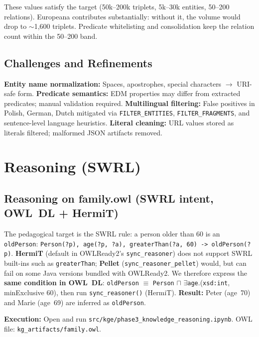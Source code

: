 \documentclass[11pt,a4paper]{article}
\begin{document}
These values satisfy the target (50k--200k triplets, 5k--30k entities, 50--200 relations). Europeana contributes substantially: without it, the volume would drop to $\sim$1,600 triplets. Predicate whitelisting and consolidation keep the relation count within the 50--200 band.

\subsection{Challenges and Refinements}

\textbf{Entity name normalization:} Spaces, apostrophes, special characters $\rightarrow$ URI-safe form. \textbf{Predicate semantics:} EDM properties may differ from extracted predicates; manual validation required. \textbf{Multilingual filtering:} False positives in Polish, German, Dutch mitigated via \texttt{FILTER\_ENTITIES}, \texttt{FILTER\_FRAGMENTS}, and sentence-level language heuristics. \textbf{Literal cleaning:} URL values stored as literals filtered; malformed JSON artifacts removed.

\section{Reasoning (SWRL)}

\subsection{Reasoning on family.owl (SWRL intent, OWL~DL + HermiT)}

The pedagogical target is the SWRL rule: a person older than 60 is an \texttt{oldPerson}: \texttt{Person(?p), age(?p, ?a), greaterThan(?a, 60) -> oldPerson(?p)}. \textbf{HermiT} (default in OWLReady2's \texttt{sync\_reasoner}) does not support SWRL built-ins such as \texttt{greaterThan}; \textbf{Pellet} (\texttt{sync\_reasoner\_pellet}) would, but can fail on some Java versions bundled with OWLReady2. We therefore express the \textbf{same condition in OWL~DL}: \texttt{oldPerson} $\equiv$ \texttt{Person} $\sqcap$ $\exists$\texttt{age}.(\texttt{xsd:int}, minExclusive 60), then run \texttt{sync\_reasoner()} (HermiT). \textbf{Result:} Peter (age~70) and Marie (age~69) are inferred as \texttt{oldPerson}.

\textbf{Execution:} Open and run \texttt{src/kge/phase3\_knowledge\_reasoning.ipynb}. OWL file: \texttt{kg\_artifacts/family.owl}.
\end{document}
